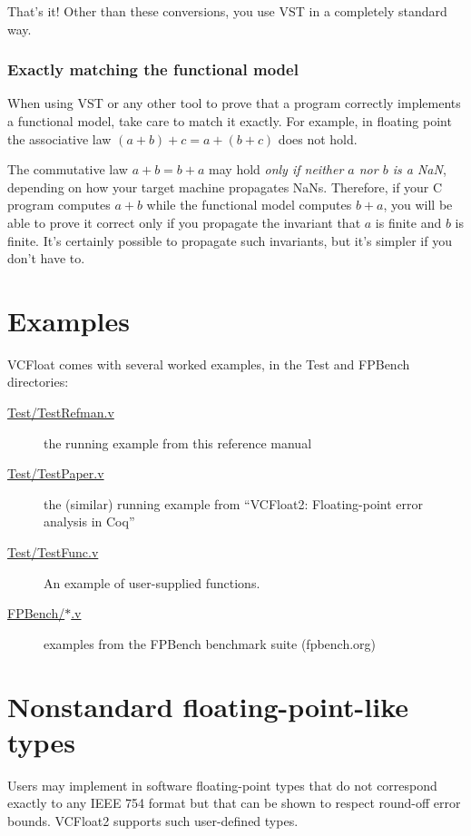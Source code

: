 \documentclass[article]{memoir}
\begin{document}
That's it!  Other than these conversions, you use VST in
a completely standard way.  

\subsection*{Exactly matching the functional model}

When using VST or any other tool to prove that a program correctly
implements a functional model, take care to
match it exactly.  For example, in floating point the
associative law $(a+b)+c=a+(b+c)$ does not hold.

The commutative law $a+b=b+a$ may hold \emph{only if
neither $a$ nor $b$ is a NaN}, depending on how your target
machine propagates NaNs.  Therefore, if your C program
computes $a+b$ while the functional model computes $b+a$,
you will be able to prove it correct only if you propagate
the invariant that $a$ is finite and $b$ is finite.
It's certainly possible to propagate such invariants, but
it's simpler if you don't have to.

\chapter{Examples}

VCFloat comes with several worked examples, in the Test and FPBench directories:
\begin{description}
\item[\href{../Test/TestRefman.v}{Test/TestRefman.v}]  the running example from this reference manual
\item[\href{../Test/TestPaper.v}{Test/TestPaper.v}]  the (similar) running example from ``VCFloat2: Floating-point error analysis in Coq''
\item[\href{../Test/TestFunc.v}{Test/TestFunc.v}]  An example of user-supplied functions.
\item[\href{../FPBench/}{FPBench/$*$.v}]  examples from the FPBench benchmark suite (fpbench.org)
\end{description}

\chapter{Nonstandard floating-point-like types}
\label{nonstandard}

Users may implement in software floating-point types that do not
correspond exactly to any IEEE 754 format but that can be shown 
to respect round-off error bounds. 
VCFloat2 supports such user-defined types.
\end{document}

